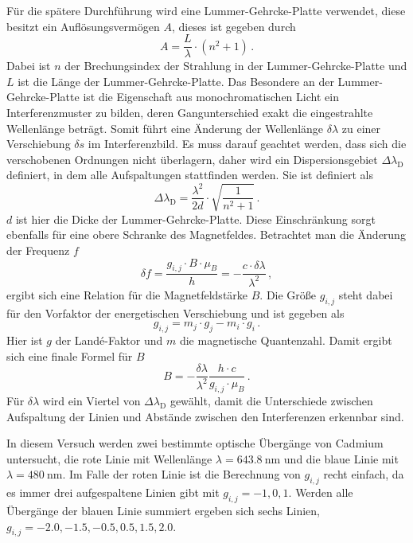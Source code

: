 Für die spätere Durchführung wird eine Lummer-Gehrcke-Platte verwendet, diese besitzt ein Auflösungsvermögen $A$, dieses ist gegeben durch 
\begin{equation}
    A = \frac{L}{\lambda} \cdot \left( n^2 + 1 \right) \, .
   \label{eq:aufloesung}
\end{equation}
Dabei ist $n$ der Brechungsindex der Strahlung in der Lummer-Gehrcke-Platte und $L$ ist die Länge der Lummer-Gehrcke-Platte. 
Das Besondere an der Lummer-Gehrcke-Platte ist die Eigenschaft aus monochromatischen Licht ein Interferenzmuster zu bilden, deren Gangunterschied exakt die eingestrahlte Wellenlänge beträgt.
Somit führt eine Änderung der Wellenlänge $\delta \lambda$ zu einer Verschiebung $\delta s$ im Interferenzbild.
Es muss darauf geachtet werden, dass sich die verschobenen Ordnungen nicht überlagern, daher wird ein Dispersionsgebiet $\Delta \lambda _\text{D}$ definiert, in dem alle Aufspaltungen stattfinden werden. 
Sie ist definiert als 
\begin{equation}
    \Delta \lambda _\text{D} = \frac{\lambda ^2}{2 d} \cdot \sqrt{ \frac{1}{n^2 + 1}    } \, .
   \label{eq:dispers}
\end{equation}
$d$ ist hier die Dicke der Lummer-Gehrcke-Platte.
Diese Einschränkung sorgt ebenfalls für eine obere Schranke des Magnetfeldes.
Betrachtet man die Änderung der Frequenz $f$
\begin{equation}
    \delta f = \frac{g_{i,j} \cdot B \cdot \mu_B }{h} = - \frac{c \cdot \delta \lambda}{\lambda ^2} \, ,
   \label{eq:freq}
\end{equation}
ergibt sich eine Relation für die Magnetfeldstärke $B$.
Die Größe $g_{i,j}$ steht dabei für den Vorfaktor der energetischen Verschiebung und ist gegeben als
\begin{equation}
    g_{i,j} = m_j \cdot g_j - m_i \cdot g_i \, .
   \label{eq:gij}
\end{equation}
Hier ist $g$ der Landé-Faktor und $m$ die magnetische Quantenzahl.
Damit ergibt sich eine finale Formel für $B$
\begin{equation}
    B = - \frac{\delta \lambda}{\lambda ^2} \frac{h \cdot c}{g_{i,j}  \cdot \mu_B} \, .
   \label{eq:bfeld}
\end{equation}
Für $\delta \lambda $ wird ein Viertel von $\Delta \lambda _\text{D}$ gewählt, damit die Unterschiede zwischen Aufspaltung der Linien und Abstände zwischen den Interferenzen erkennbar sind.

In diesem Versuch werden zwei bestimmte optische Übergänge von Cadmium untersucht, die rote Linie mit Wellenlänge $\lambda = \SI{643.8}{\nano\meter}$ 
und die blaue Linie mit $\lambda = \SI{480}{\nano\meter}$.
Im Falle der roten Linie ist die Berechnung von $g_{i,j}$ recht einfach, da es immer drei aufgespaltene Linien gibt mit $g_{i,j} = -1, 0, 1$.
Werden alle Übergänge der blauen Linie summiert ergeben sich sechs Linien, $g_{i,j} = -2.0, -1.5, -0.5, 0.5, 1.5, 2.0$.